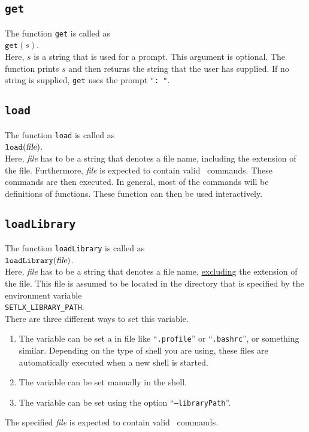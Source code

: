 \subsection{\texttt{get}}
The function \texttt{get}  is called as
\\[0.2cm]
\hspace*{1.3cm}
$\mathtt{get}(s)$.
\\[0.2cm]
Here, $s$ is a string that is used for a prompt. This argument is optional.  The function prints $s$ and then
returns the string that the user has supplied.  If no string is supplied, \texttt{get}
uses the prompt \texttt{": "}.

\subsection{\texttt{load}}
The function \texttt{load}  is called as
\\[0.2cm]
\hspace*{1.3cm}
$\mathtt{load}(\textsl{file})$.
\\[0.2cm]
Here, \textsl{file} has to be a string that denotes a file name, including  the extension
of the file.  Furthermore, \textsl{file} is expected to contain valid \setlx\ commands.
These commands are then executed.  In general, most of the commands will be definitions of
functions.  These function can then be used interactively.

\subsection{\texttt{loadLibrary}}
The function \texttt{loadLibrary}  is called as
\\[0.2cm]
\hspace*{1.3cm}
$\mathtt{loadLibrary}(\textsl{file})$.
\\[0.2cm]
Here, \textsl{file} has to be a string that denotes a file name, \underline{excludin}g  the extension
of the file.  This file is assumed to be located in the directory that is specified by the
environment variable 
\\[0.2cm]
\hspace*{1.3cm}
\texttt{SETLX\_LIBRARY\_PATH}.
\\[0.2cm]
There are three different ways to set this variable.
\begin{enumerate}
\item The variable can be  set a in file like ``\texttt{.profile}'' or
      ``\texttt{.bashrc}'', or something similar.  Depending on the type of shell you are
      using, these files are automatically executed when a new shell is started.
\item The variable can be set manually in the shell.
\item The variable can be set using the option ``\texttt{--libraryPath}''.
\end{enumerate}
The specified \textsl{file} is expected to contain valid \setlx\ commands.


